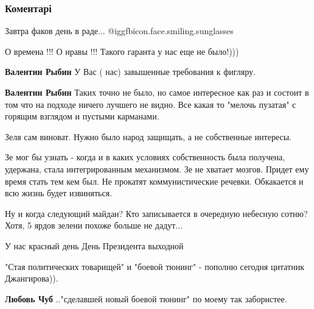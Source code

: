  
 
 
 
 
\subsubsection{Коментарі}
\label{sec:30_11_2021.fb.dzhangirov_dmitrij.kiev.1.press_marafon_zelenskogo.cmt}

\begin{itemize} %
Завтра факов день в раде... @igg{fbicon.face.smiling.sunglasses} 

О времена !!! О нравы !!!
Такого гаранта у нас еще не было!)))

\begin{itemize} %
\textbf{Валентин Рыбин} У Вас ( нас) завышенные требования к фигляру.

\textbf{Валентин Рыбин} Таких точно не было, но самое интересное как раз и
состоит в том что на подходе ничего лучшего не видно. Все какая то "мелочь
пузатая" с горящим взглядом и пустыми карманами.
\end{itemize} %

Зеля сам виноват. Нужно было народ защищать, а не собственные интересы.


Зе мог бы узнать - когда и в каких условиях собственность была получена,
удержана, стала интегрированным механизмом. Зе не хватает мозгов. Придет ему
время стать тем кем был. Не прокатят коммунистические речевки. Обкакается и всю
жизнь будет извиняться.

Ну и когда следующий майдан? Кто записывается в очередную небесную сотню? Хотя, 5 ярдов зелени похоже больше не дадут...

У нас красный день День Президента выходной

"Стая политических товарищей" и "боевой тюнинг" - пополню сегодня цитатник Джангирова)).

\begin{itemize} %
\textbf{Любовь Чуб} .."сделавшей новый боевой тюнинг" по моему так забористее.


\end{itemize}
\end{itemize}
